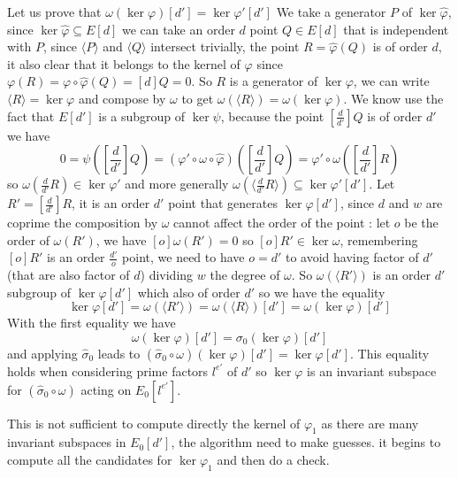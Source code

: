 \documentclass[12pt,a4paper]{article}
\begin{document}
			Let us prove that $\omega(\ker\varphi)[d']=\ker\varphi'[d']$
			We take a generator $P$ of $\ker\widehat\varphi$, since $\ker\widehat\varphi\subseteq E[d]$
			we can take
			an order $d$ point $Q\in E[d]$ that is independent with $P$, since $\langle P\rangle$ and  $\langle
			Q \rangle$ intersect trivially, the point  $R=\widehat\varphi(Q)$ is of order $d$, it also clear that
			it belongs to the kernel of  $\varphi$ since $\varphi(R)=\varphi\circ\widehat\varphi(Q)=[d]Q=0$.
			So $R$ is a generator of $\ker\varphi$, we can write $\langle R\rangle = \ker\varphi$ and
			compose by  $\omega$ to get $\omega(\langle R\rangle)=\omega(\ker\varphi)$.
			We know use the fact that $E[d']$ is a subgroup of $\ker\psi$, because the point $[\frac{d}{d'}]Q$
			is of order $d'$ we have
			\[
				0=\psi\left(\left[\frac{d}{d'}\right] Q\right) =
				(\varphi'\circ\omega\circ \widehat\varphi)\left(\left[\frac{d}{d'}\right]Q\right)
				= \varphi'\circ\omega\left(\left[\frac{d}{d'}\right]R\right)
			\] so $\omega(\frac{d}{d'}R)\in\ker\varphi'$ and more generally $\omega(\langle
			\frac{d}{d'}R\rangle)\subseteq\ker\varphi'[d']$.
			Let $R'=[\frac{d}{d'}]R$, it is an order $d'$ point that generates $\ker\varphi[d']$, since $d$ and
			$w$ are coprime the composition by $\omega$ cannot affect the order of the point : let $o$ be the
			order of $\omega(R')$, we have  $[o]\omega(R')=0$ so $[o]R'\in\ker\omega$, remembering $[o]R'$ is an
			order $\frac{d'}{o}$ point, we need to have $o=d'$ to avoid having factor of $d'$ (that are also
			factor of $d$) dividing $w$ the degree of $\omega$. So $\omega(\langle R'\rangle)$ is an order $d'$ 
			subgroup of $\ker\varphi[d']$ which also of order  $d'$ so we have the equality \[
				\ker\varphi[d']=\omega(\langle R'\rangle)=\omega(\langle R\rangle)[d']=\omega(\ker\varphi)[d']
			\] 
			With the first equality we have \[
				\omega(\ker\varphi)[d'] = \sigma_0(\ker\varphi)[d']
			\] 
			and applying $\widehat\sigma_0$ leads to
			$(\widehat\sigma_0\circ\omega)(\ker\varphi)[d']=\ker\varphi[d']$.
			This equality holds when considering prime factors $l^{e'}$ of $d'$ so $\ker\varphi$ is an
			invariant subspace for $(\widehat\sigma_0\circ\omega)$ acting on $E_0[l^{e'}]$.

			This is not sufficient to compute directly the kernel of $\varphi_1$ as there are many invariant
			subspaces in $E_0[d']$, the algorithm need to make guesses. it begins to compute all the candidates
			for $\ker\varphi_1$ and then do a check.
			
\end{document}

